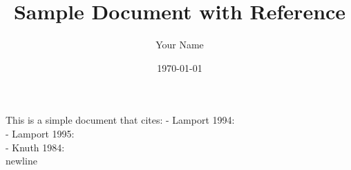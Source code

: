 \documentclass{article}
\title{Sample Document with Reference}
\author{Your Name}
\date{\today}
\begin{document}
\maketitle

This is a simple document that cites:
- Lamport 1994:~\cite{lamport1994}\\
- Lamport 1995:~\cite{lamport1995}\\
- Knuth 1984:~\cite{knuth1984}\\
newline


\end{document}
